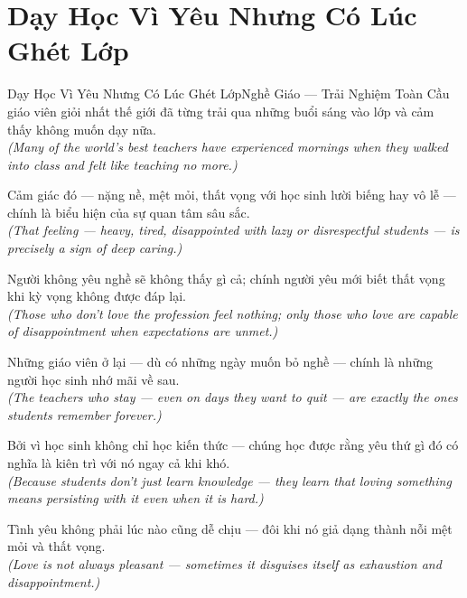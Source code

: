 \section{Dạy Học Vì Yêu Nhưng Có Lúc Ghét Lớp}
\begin{truyen}{Dạy Học Vì Yêu Nhưng Có Lúc Ghét Lớp}{Nghề Giáo --- Trải Nghiệm Toàn Cầu}
 giáo viên giỏi nhất thế giới đã từng trải qua những buổi sáng vào lớp và cảm thấy không muốn dạy nữa.\\[4pt]
\textit{(Many of the world's best teachers have experienced mornings when they walked into class and felt like teaching no more.)}

Cảm giác đó --- nặng nề, mệt mỏi, thất vọng với học sinh lười biếng hay vô lễ --- chính là biểu hiện của sự quan tâm sâu sắc.\\[4pt]
\textit{(That feeling --- heavy, tired, disappointed with lazy or disrespectful students --- is precisely a sign of deep caring.)}

Người không yêu nghề sẽ không thấy gì cả; chính người yêu mới biết thất vọng khi kỳ vọng không được đáp lại.\\[4pt]
\textit{(Those who don't love the profession feel nothing; only those who love are capable of disappointment when expectations are unmet.)}

Những giáo viên ở lại --- dù có những ngày muốn bỏ nghề --- chính là những người học sinh nhớ mãi về sau.\\[4pt]
\textit{(The teachers who stay --- even on days they want to quit --- are exactly the ones students remember forever.)}

Bởi vì học sinh không chỉ học kiến thức --- chúng học được rằng yêu thứ gì đó có nghĩa là kiên trì với nó ngay cả khi khó.\\[4pt]
\textit{(Because students don't just learn knowledge --- they learn that loving something means persisting with it even when it is hard.)}

\end{truyen}
\begin{baihoc}
  Tình yêu không phải lúc nào cũng dễ chịu --- đôi khi nó giả dạng thành nỗi mệt mỏi và thất vọng.\\[4pt]
  \textit{(Love is not always pleasant --- sometimes it disguises itself as exhaustion and disappointment.)}
\end{baihoc}

